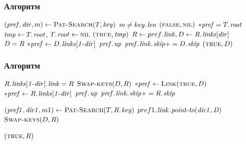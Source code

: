 \documentclass[hyperref={unicode=true}]{beamer}
\begin{document}
\frame
{
\frametitle{Алгоритм}
  \begin{codebox}
      \li $(\id{pref}, \id{dir}, m) \gets \proc{Pat-Search}(T, \id{key})$
      \li \If $m \neq \attrib{key}{len}$
          \Then
      \li \Return $(\textnormal{\scshape false}, \textnormal{\scshape nil})$
          \End
      \li \If $*\id{pref} \isequal \attrib{T}{root}$
          \Then
      \li $\id{tmp} \gets \attrib{T}{root}$, $\attrib{T}{root} \gets \const{nil}$
      \li \Return $(\const{true}, \id{tmp})$
          \End
      \li $R \gets \attrib{pref}{link}, D \gets \attrib{R}{links[dir]}$
      \li \If $D \mathrel{=} R$
          \Then
      \li $*\id{pref} \gets \attrib{D}{links[\id{1 - dir}]}$
      \li      \If {} $\attrib{\id{pref}}{up}$
                \Then
      \li      $\attribb{\id{pref}}{link}{skip} += \attrib{D}{skip}$
               \End
      \li \Return $(\textnormal{\scshape true}, D)$
 \end{codebox}
}

\frame
{
\frametitle{Алгоритм}
  \begin{codebox}
      \li \If $\attribb{R}{links[1 - dir]}{link} \isequal R$
          \Then
      \li $\textnormal{\scshape Swap-keys}(D, R)$
      \li $*\id{pref} \gets \proc{Link}(\const{true}, D)$
      \li \Else
      \li   $*\id{pref} \gets \attrib{R}{links[1 - dir]}$
      \li   \If {} $\attrib{\id{pref}}{up}$
                \Then
      \li      $\attribb{\id{pref}}{link}{skip} += \attrib{R}{skip}$
               \End
      
      \li   $(\id{pref1}, \id{dir1}, m1) \gets \proc{Pat-Search}(T, \attrib{R}{key})$
      \li $\attribb{pref1}{link}{point-to(dir1, D)}$
      \li $\textnormal{\scshape Swap-keys}(D, R)$

         \End
      \li \Return $(\textnormal{\scshape true}, R)$
 \end{codebox}
}
\end{document}
